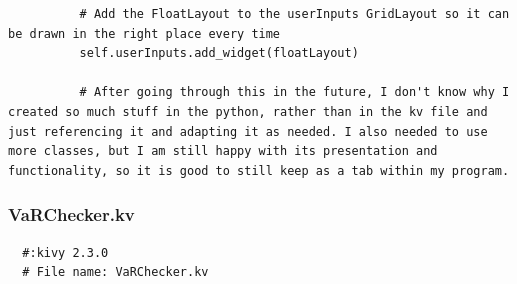 \documentclass{article}
\begin{document}
\begin{verbatim}
          # Add the FloatLayout to the userInputs GridLayout so it can be drawn in the right place every time
          self.userInputs.add_widget(floatLayout)

          # After going through this in the future, I don't know why I created so much stuff in the python, rather than in the kv file and just referencing it and adapting it as needed. I also needed to use more classes, but I am still happy with its presentation and functionality, so it is good to still keep as a tab within my program.
\end{verbatim}
\vspace{0.5cm}
\subsubsection{VaRChecker.kv}
\begin{verbatim}
  #:kivy 2.3.0
  # File name: VaRChecker.kv


\end{verbatim}
\end{document}
